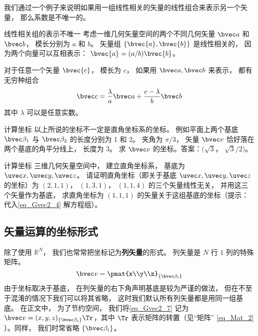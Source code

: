 我们通过一个例子来说明如果用一组线性相关的矢量的线性组合来表示另一个矢量， 那么系数是不唯一的。

\begin{example}{线性相关组的表示不唯一}
考虑一维几何矢量空间的两个不同几何矢量 $\bvec a$ 和 $\bvec b$， 模长分别为 $a$ 和 $b$。 矢量组 $\{\bvec{a}, \bvec{b}\}$ 是线性相关的， 因为两个向量可以互相表示： $\bvec{a}=(a/b)\bvec{b}$。

对于任意一个矢量 $\bvec{c}$， 模长为 $c$， 如果用 $\bvec a, \bvec b$ 来表示， 都有无穷种组合
\begin{equation}
\bvec c = \frac{\lambda}{a} \bvec a + \frac{c - \lambda}{b} \bvec b
\end{equation}
其中 $\lambda$ 可以是任意实数。
\end{example}

\begin{exercise}{计算坐标}
以上所说的坐标不一定是直角坐标系的坐标。 例如平面上两个基底 $\bvec \beta_1$ 与 $\bvec \beta_2$ 的长度分别为 1 和 2。 夹角为 $\pi/3$， 矢量 $\bvec v$ 恰好落在两个基底的角平分线上， 长度为 3。 求 $\bvec v$ 的坐标。答案：$(\sqrt 3$， $\sqrt 3/2)$。
\end{exercise}

\begin{exercise}{计算坐标}
三维几何矢量空间中， 建立直角坐标系， 基底为 $\uvec x, \uvec y, \uvec z$。 请证明直角坐标（即关于基底 $\uvec x, \uvec y, \uvec z$ 的坐标）为 $(2, 1, 1)$， $(1, 3, 1)$， $(1, 1, 4)$ 的三个矢量线性无关， 并用这三个矢量作为基底， 求直角坐标为 $(1, 1, 1)$ 的矢量关于这组基底的坐标（提示：代入\autoref{eq_Gvec2_4} 解方程组）。
\end{exercise}

\subsection{矢量运算的坐标形式}
除了使用 $\mathbb R^N$， 我们也常常把坐标记为\textbf{列矢量}的形式。 列矢量是 $N$ 行 $1$ 列的特殊矩阵。
\begin{equation}\label{eq_Gvec2_7}
\bvec v = \pmat{x\\y\\z}_{\{\bvec\beta_i\}}
\end{equation}
由于坐标取决于基底， 在列矢量的右下角声明基底是较为严谨的做法， 但在不至于混淆的情况下我们可以将其省略， 这时我们默认所有列矢量都是用同一组基底。 在正文中， 为了节约空间， 我们将\autoref{eq_Gvec2_7} 记为 $\bvec v = (x, y, z)_{\{\bvec\beta_i\}}\Tr$，其中 $\Tr$ 表示矩阵的转置（见“矩阵” \autoref{eq_Mat_2} ）。同样， 我们时常省略 $\{\bvec\beta_i\}$。

